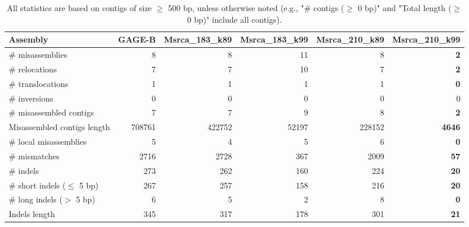 \documentclass[12pt,a4paper]{article}
\begin{document}
\begin{table}[ht]
\begin{center}
\caption{All statistics are based on contigs of size $\geq$ 500 bp, unless otherwise noted (e.g., "\# contigs ($\geq$ 0 bp)" and "Total length ($\geq$ 0 bp)" include all contigs).}
\begin{tabular}{|l*{5}{|r}|}
\hline
Assembly & GAGE-B & Msrca\_183\_k89 & Msrca\_183\_k99 & Msrca\_210\_k89 & Msrca\_210\_k99 \\ \hline
\# misassemblies & 8 & 8 & 11 & 8 & {\bf 2} \\ \hline
\hspace{5mm}\# relocations & 7 & 7 & 10 & 7 & {\bf 2} \\ \hline
\hspace{5mm}\# translocations & 1 & 1 & 1 & 1 & {\bf 0} \\ \hline
\hspace{5mm}\# inversions & 0 & 0 & 0 & 0 & 0 \\ \hline
\# misassembled contigs & 7 & 7 & 9 & 8 & {\bf 2} \\ \hline
Misassembled contigs length & 708761 & 422752 & 52197 & 228152 & {\bf 4646} \\ \hline
\# local misassemblies & 5 & 4 & 5 & 6 & {\bf 0} \\ \hline
\# mismatches & 2716 & 2728 & 367 & 2009 & {\bf 57} \\ \hline
\# indels & 273 & 262 & 160 & 224 & {\bf 20} \\ \hline
\hspace{5mm}\# short indels ($\leq$ 5 bp) & 267 & 257 & 158 & 216 & {\bf 20} \\ \hline
\hspace{5mm}\# long indels ($>$ 5 bp) & 6 & 5 & 2 & 8 & {\bf 0} \\ \hline
Indels length & 345 & 317 & 178 & 301 & {\bf 21} \\ \hline
\end{tabular}
\end{center}
\end{table}
\end{document}
